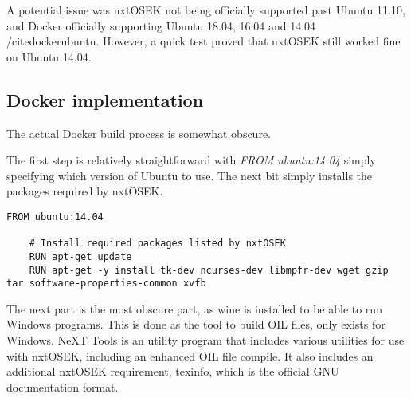 A potential issue was nxtOSEK not being officially supported past Ubuntu 11.10, and Docker officially supporting Ubuntu 18.04, 16.04 and 14.04 /cite{dockerubuntu}.
However, a quick test proved that nxtOSEK still worked fine on Ubuntu 14.04.

\subsection{Docker implementation}\label{subsec:dockerimplementation}
The actual Docker build process is somewhat obscure.

The first step is relatively straightforward with \textit{FROM ubuntu:14.04} simply specifying which version of Ubuntu to use.
The next bit simply installs the packages required by nxtOSEK.
\begin{lstlisting}[language=docker,label={lst:dockerimplementation1},caption={Version definition and installation of packages required by nxtOSEK}]
    FROM ubuntu:14.04

    # Install required packages listed by nxtOSEK
    RUN apt-get update
    RUN apt-get -y install tk-dev ncurses-dev libmpfr-dev wget gzip tar software-properties-common xvfb
\end{lstlisting} 

The next part is the most obscure part, as wine is installed to be able to run Windows programs.
This is done as the tool to build OIL files, only exists for Windows.
NeXT Tools is an utility program that includes various utilities for use with nxtOSEK, including an enhanced OIL file compile\cite{nxttool}.
It also includes an additional nxtOSEK requirement, texinfo, which is the official GNU documentation format\cite{texinfo}.

